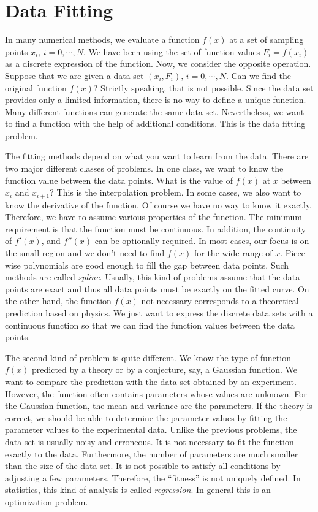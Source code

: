 \chapter{Data Fitting}\label{ch:data-fitting}

In many numerical methods, we evaluate a function $f(x)$ at a set of sampling points $x_i,\, i=0, \cdots, N$.  We have been using the set of function values $F_i=f(x_i)$ as a discrete expression of the function.    Now, we consider the opposite operation.
Suppose that we are given a data set $(x_i, F_i),\, i=0,\cdots, N$.  Can we find the original function $f(x)$?  Strictly speaking, that is not possible. Since the data set provides only a limited information, there is no way to define a unique function.  Many different functions can generate the same data set.  Nevertheless, we want to find a function with the help of additional conditions. This is the data fitting problem.

The fitting methods depend on what you want to learn from the data.   There are two major different classes of problems.  
In one class,
we want to know the function value between the data points.  What is the value of $f(x)$ at $x$ between $x_i$ and $x_{i+1}$?   This is the interpolation problem.  In some cases, we also want to know the derivative of the function.  Of course we have no way to know it exactly. Therefore, we have to assume various properties of the function.  The minimum requirement is that the function must be continuous. In addition, the continuity of $f'(x)$, and $f''(x)$ can be optionally required.  In most cases, our focus is on the small region and we don't need to find $f(x)$ for the wide range of $x$. Piece-wise polynomials are good enough to fill the gap between data points.  Such methods are called \textit{spline}.   Usually, this kind of problems assume that the data points are exact and thus all data points must be exactly on the fitted curve.  On the other hand, the function $f(x)$ not necessary corresponds to a theoretical prediction based on physics.  We just want to express the discrete data sets with a continuous function so that we can find the function values between the data points.

The second kind of problem is quite different.  We know the type of function $f(x)$ predicted by a theory or by a conjecture, say, a Gaussian function.  We want to compare the prediction with the data set obtained by an experiment.  However, the function often contains parameters whose values are unknown.  For the Gaussian function, the mean and variance are the parameters. If the theory is correct, we should be able to determine the parameter values by fitting the parameter values to the experimental data.  Unlike the previous problems, the data set is usually noisy and erroneous.  It is not necessary to fit the function exactly to the data.  Furthermore, the number of parameters are much smaller than the size of the data set.  It is not possible to satisfy all conditions by adjusting a few parameters. Therefore, the ``fitness'' is not uniquely defined.  In statistics, this kind of analysis is called \textit{regression}.  In general this is an optimization problem. 

